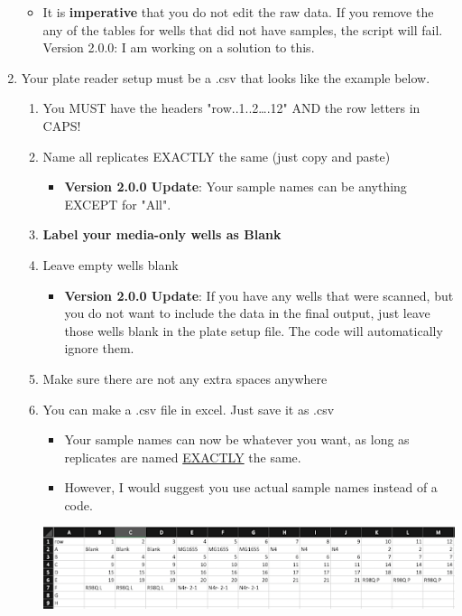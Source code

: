 \documentclass[12pt]{article}
\begin{document}
\begin{enumerate}
\begin{itemize}
\item It is \textbf{imperative} that you do not edit the raw data. If you remove the any of the tables for wells that did not have samples, the script will fail. Version 2.0.0: I am working on a solution to this.
\end{itemize}

\item Your plate reader setup must be a .csv that looks like the example
below.

\begin{enumerate}
\item You MUST have the headers "row..1..2\ldots{}.12" AND the row letters in
CAPS!
\item Name all replicates EXACTLY the same (just copy and paste)
\begin{itemize}
\item \textbf{Version 2.0.0 Update}: Your sample names can be anything EXCEPT for "All".
\end{itemize}
\item \textbf{Label your media-only wells as Blank}
\item Leave empty wells blank
\begin{itemize}
\item \textbf{Version 2.0.0 Update}: If you have any wells that were scanned, but you do not want to include the data in the final output, just leave those wells blank in the plate setup file. The code will automatically ignore them.
\end{itemize}
\item Make sure there are not any extra spaces anywhere
\item You can make a .csv file in excel. Just save it as .csv
\begin{itemize}
\item Your sample names can now be whatever you want, as long as replicates are named \uline{EXACTLY} the same.
\item However, I would suggest you use actual sample names instead of a code.
\end{itemize}

\begin{center}
\includegraphics[width=.9\linewidth]{./docs/process_plate_reader_data_image03.png}
\end{center}
\end{enumerate}
\end{enumerate}
\end{document}
